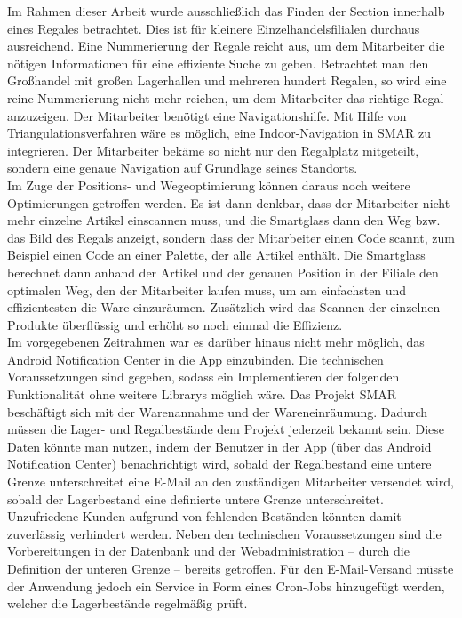 Im Rahmen dieser Arbeit wurde ausschließlich das Finden der Section innerhalb eines Regales betrachtet. Dies ist für kleinere Einzelhandelsfilialen durchaus ausreichend. Eine Nummerierung der Regale reicht aus, um dem Mitarbeiter die nötigen Informationen für eine effiziente Suche zu geben. Betrachtet man den Großhandel mit großen Lagerhallen und mehreren hundert Regalen, so wird eine reine Nummerierung nicht mehr reichen, um dem Mitarbeiter das richtige Regal anzuzeigen. Der Mitarbeiter benötigt eine Navigationshilfe. Mit Hilfe von Triangulationsverfahren wäre es möglich, eine Indoor-Navigation in \ac{SMAR} zu integrieren. Der Mitarbeiter bekäme so nicht nur den Regalplatz mitgeteilt, sondern eine genaue Navigation auf Grundlage seines Standorts.\\
Im Zuge der Positions- und Wegeoptimierung können daraus noch weitere Optimierungen getroffen werden. Es ist dann denkbar, dass der Mitarbeiter nicht mehr einzelne Artikel einscannen muss, und die Smartglass dann den Weg bzw. das Bild des Regals anzeigt, sondern dass der Mitarbeiter einen Code scannt, zum Beispiel einen Code an einer Palette, der alle Artikel enthält. Die Smartglass berechnet dann anhand der Artikel und der genauen Position in der Filiale den optimalen Weg, den der Mitarbeiter laufen muss, um am einfachsten und effizientesten die Ware einzuräumen. Zusätzlich wird das Scannen der einzelnen Produkte überflüssig und erhöht so noch einmal die Effizienz.\\

Im vorgegebenen Zeitrahmen war es darüber hinaus nicht mehr möglich, das Android Notification Center in die App einzubinden. Die technischen Voraussetzungen sind gegeben, sodass ein Implementieren der folgenden Funktionalität ohne weitere Librarys möglich wäre. Das Projekt \ac{SMAR} beschäftigt sich mit der Warenannahme und der Wareneinräumung. Dadurch müssen die Lager- und Regalbestände dem Projekt jederzeit bekannt sein. Diese Daten könnte man nutzen, indem der Benutzer in der App (\zB über das Android Notification Center) benachrichtigt wird, sobald der Regalbestand eine untere Grenze unterschreitet \bzw eine E-Mail an den zuständigen Mitarbeiter versendet wird, sobald der Lagerbestand eine definierte untere Grenze unterschreitet. Unzufriedene Kunden aufgrund von fehlenden Beständen könnten damit zuverlässig verhindert werden. Neben den technischen Voraussetzungen sind die Vorbereitungen in der Datenbank und der Webadministration -- durch die Definition der unteren Grenze -- bereits getroffen. Für den E-Mail-Versand müsste der Anwendung jedoch ein Service \zB in Form eines Cron-Jobs hinzugefügt werden, welcher die Lagerbestände regelmäßig prüft.\\

